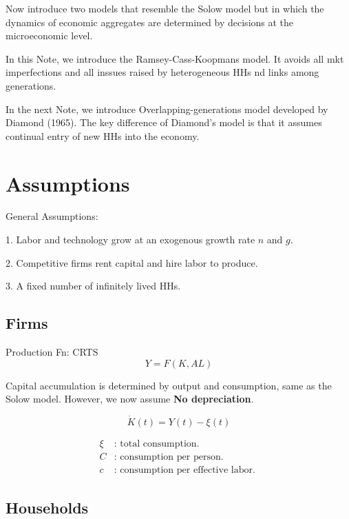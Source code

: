 \documentclass[12pt]{article}
\title{}
\author{}
\date{}
\begin{document}
Now introduce two models that resemble the Solow model but in which the dynamics of
economic aggregates are determined by decisions at the microeconomic level.

In this Note, we introduce the Ramsey-Cass-Koopmans model. It avoids all mkt 
imperfections and all inssues raised by heterogeneous HHs nd links among generations.

In the next Note, we introduce Overlapping-generations model developed by Diamond 
(1965).
The key difference of Diamond's model is that it assumes continual entry of new HHs
into the economy.






\section{Assumptions}

General Assumptions:

1. Labor and technology grow at an exogenous growth rate $ n $ and $ g $.

2. Competitive firms rent capital and hire labor to produce.

3. A fixed number of infinitely lived HHs.



\subsection{Firms}

Production Fn: CRTS
\begin{equation*}
Y = F(K,AL)
\end{equation*}


Capital accumulation is determined by output and consumption, same as the Solow model. 
However, we now assume {\textbf {No depreciation}}.

\begin{equation*}
\dot{K}(t) = Y(t) - \xi(t)
\end{equation*}

\begin{align*}
		\xi&: \text{ total consumption. }\\
		C &: \text{ consumption per person. }\\
		c &: \text{ consumption per effective labor. }
\end{align*}



\subsection{Households}
\end{document}
